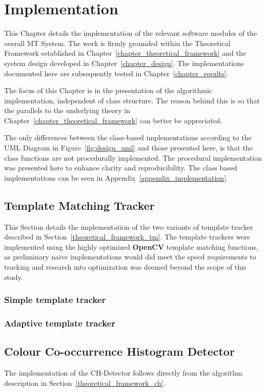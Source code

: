 \chapter{Implementation}\label{chapter_implementation}
This Chapter details the implementation of the relevant software modules of the
overall MT System. The work is firmly grounded within the Theoretical Framework
established in Chapter~\ref{chapter_theoretical_framework} and the system design
developed in Chapter~\ref{chapter_design}. The implementations documented here
are subsequently tested in Chapter~\ref{chapter_results}.

The focus of this Chapter is in the presentation of the algorithmic
implementation, independent of class structure. The reason behind this is so
that the parallels to the underlying theory in
Chapter~\ref{chapter_theoretical_framework} can better be appreciated.

The only differences between the class-based implementations according to the
UML Diagram in Figure~\ref{fig:design_uml} and those presented here, is that the
class functions are not procedurally implemented. The procedural implementation
was presented here to enhance clarity and reproducibility. The class based
implementations can be seen in Appendix~\ref{appendix_implementation}.

\section{Template Matching Tracker}\label{implementation_tm}
This Section details the implementation of the two variants of template tracker
described in Section~\ref{theoretical_framework_tm}. The template trackers were
implemented using the highly optimized \textbf{OpenCV} template matching
functions, as preliminary naive implementations would did meet the speed requirements to
tracking and research into optimization was deemed beyond the scope of this
study.

\subsection{Simple template tracker}

\subsection{Adaptive template tracker}


\section{Colour Co-occurrence Histogram Detector}\label{implementation_ch}
The implementation of the CH-Detector follows directly from the algorithm
description in Section~\ref{theoretical_framework_ch}.


